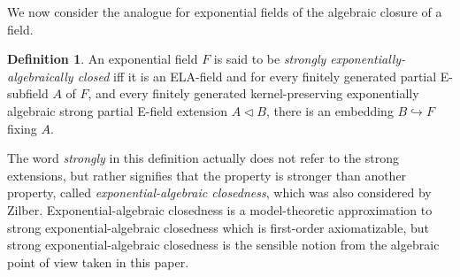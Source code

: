\documentclass[12pt]{amsart}
\theoremstyle{definition}
\newtheorem{defn}[prop]{Definition}
\begin{document}
We now consider the analogue for exponential fields of the algebraic closure of a field. 

\begin{defn}
  An exponential field $F$ is said to be \emph{strongly exponentially-algebraically closed} iff it is an ELA-field and for every finitely generated partial E-subfield $A$ of $F$, and every finitely generated kernel-preserving exponentially algebraic strong partial E-field extension $A {\ensuremath{\lhd}} B$, there is an embedding $B {\hookrightarrow} F$ fixing $A$.
\end{defn}

The word \emph{strongly} in this definition actually does not refer to
the strong extensions, but rather signifies that the property is
stronger than another property, called \emph{exponential-algebraic
  closedness}, which was also considered by Zilber. Exponential-algebraic
closedness is a model-theoretic approximation to strong
exponential-algebraic closedness which is first-order axiomatizable,
but strong exponential-algebraic closedness is the sensible notion
from the algebraic point of view taken in this paper.
\end{document}
